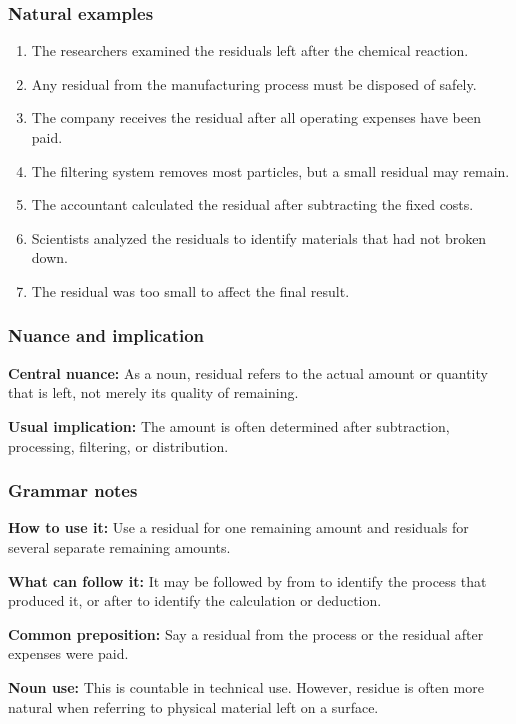 \documentclass[11pt]{article}
\begin{document}
\subsubsection{Natural examples}
\begin{enumerate}
  \item The researchers examined the residuals left after the chemical reaction.
  \item Any residual from the manufacturing process must be disposed of safely.
  \item The company receives the residual after all operating expenses have been paid.
  \item The filtering system removes most particles, but a small residual may remain.
  \item The accountant calculated the residual after subtracting the fixed costs.
  \item Scientists analyzed the residuals to identify materials that had not broken down.
  \item The residual was too small to affect the final result.
\end{enumerate}

\subsubsection{Nuance and implication}
\textbf{Central nuance:} As a noun, residual refers to the actual amount or quantity that is left, not merely its quality of remaining.

\textbf{Usual implication:} The amount is often determined after subtraction, processing, filtering, or distribution.

\subsubsection{Grammar notes}
\textbf{How to use it:} Use a residual for one remaining amount and residuals for several separate remaining amounts.

\textbf{What can follow it:} It may be followed by from to identify the process that produced it, or after to identify the calculation or deduction.

\textbf{Common preposition:} Say a residual from the process or the residual after expenses were paid.

\textbf{Noun use:} This is countable in technical use. However, residue is often more natural when referring to physical material left on a surface.
\end{document}
